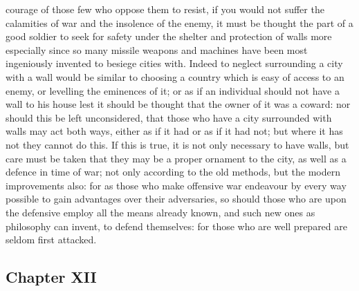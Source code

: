 \documentclass[12pt]{article}
\begin{document}
courage of those few who oppose them to resist, if you would not suffer the calamities of war and the insolence of the enemy, it must be thought the part of a good soldier to seek for safety under the shelter and protection of walls more especially since so many missile weapons and machines have been most ingeniously invented to besiege cities with. Indeed to neglect surrounding a city with a wall would be similar to choosing a country which is easy of access to an enemy, or levelling the eminences of it; or as if an individual should not have a wall to his house lest it should be thought that the owner of it was a coward: nor should this be left unconsidered, that those who have a city surrounded with walls may act both ways, either as if it had or as if it had not; but where it has not they cannot do this. If this is true, it is not only necessary to have walls, but care must be taken that they may be a proper ornament to the city, as well as a defence in time of war; not only according to the old methods, but the modern improvements also: for as those who make offensive war endeavour by every way possible to gain advantages over their adversaries, so should those who are upon the defensive employ all the means already known, and such new ones as philosophy can invent, to defend themselves: for those who are well prepared are seldom first attacked.

\subsection*{Chapter XII}
\end{document}
